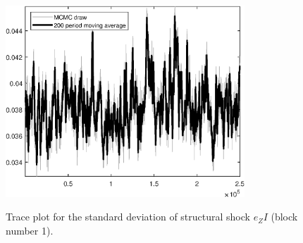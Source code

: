 \begin{figure}[H]
\centering
  \includegraphics[width=0.8\textwidth]{BRS_comovement/graphs/TracePlot_SE_e_ZI_blck_1}\\
    \caption{Trace plot for the standard deviation of structural shock ${e_ZI}$ (block number 1).}
\end{figure}
